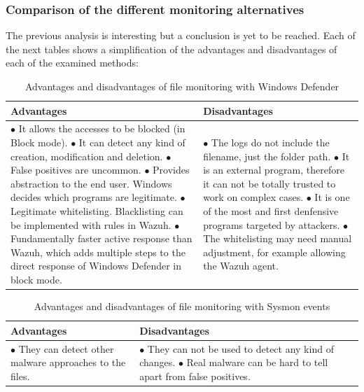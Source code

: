 \subsubsection{Comparison of the different monitoring alternatives}
The previous analysis is interesting but a conclusion is yet to be reached.
Each of the next tables shows a simplification of the advantages and disadvantages of each of the examined methods:
\begin{table}[H]
	\begin{tabularx}{\textwidth}{|w|w|}
		\hline
		Advantages & Disadvantages\\ \hline
			$\bullet$ It allows the accesses to be blocked (in Block mode).
			\linej $\bullet$ It can detect any kind of creation, modification and deletion.
			\linej $\bullet$ False positives are uncommon.
			\linej $\bullet$ Provides abstraction to the end user. Windows decides which programs are legitimate.
			\linej $\bullet$ Legitimate whitelisting. Blacklisting can be implemented with rules in Wazuh.
			\linej $\bullet$ Fundamentally faster active response than Wazuh, which adds multiple steps to the direct response of Windows Defender in block mode.
		&
			$\bullet$ The logs do not include the filename, just the folder path.
			\linej $\bullet$ It is an external program, therefore it can not be totally trusted to work on complex cases.
			\linej $\bullet$ It is one of the most and first denfensive programs targeted by attackers.
			\linej $\bullet$ The whitelisting may need manual adjustment, for example allowing the Wazuh agent.
			\\ \hline
	\end{tabularx}
	\caption{Advantages and disadvantages of file monitoring with Windows Defender}
\end{table}

\begin{table}[H]
	\begin{tabularx}{\textwidth}{|w|w|}
		\hline
		Advantages & Disadvantages\\ \hline
			$\bullet$ They can detect other malware approaches to the files.
		&
			$\bullet$ They can not be used to detect any kind of changes.
			\linej $\bullet$ Real malware can be hard to tell apart from false positives.
			\\ \hline
	\end{tabularx}
	\caption{Advantages and disadvantages of file monitoring with Sysmon events}
\end{table}

